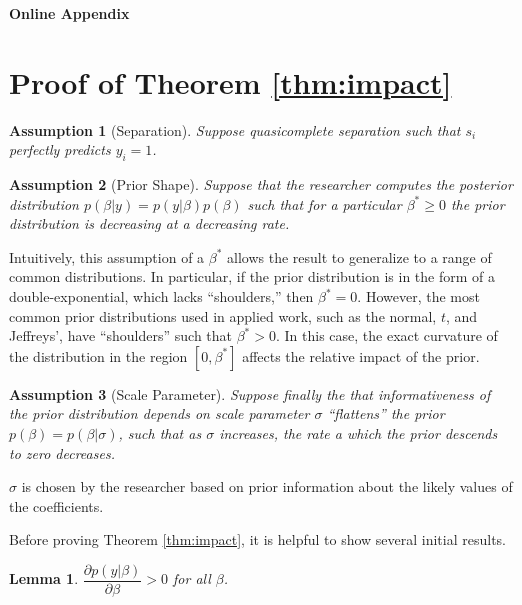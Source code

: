 \documentclass[12pt]{article}
\newtheorem{lemma}{Lemma}
\newtheorem{assumption}{Assumption}
\begin{document}
\clearpage
\begin{appendix}
\begin{center}
\LARGE{\textbf{Online Appendix}}\vspace{4mm}
\end{center}

\section*{Proof of Theorem \ref{thm:impact}}

\begin{assumption}[Separation]
Suppose quasicomplete separation such that $s_i$ perfectly predicts $y_i = 1$. 
\end{assumption}

\begin{assumption}[Prior Shape]
Suppose that the researcher computes the posterior distribution $p(\beta | y) = p(y | \beta)p(\beta)$ such that for a particular $\beta^* \geq 0$ the prior distribution is decreasing at a decreasing rate.
\end{assumption}

Intuitively, this assumption of a $\beta^*$ allows the result to generalize to a range of common distributions. In particular, if the prior distribution is in the form of a double-exponential, which lacks ``shoulders,'' then $\beta^* = 0$. However, the most common prior distributions used in applied work, such as the normal, $t$, and Jeffreys', have ``shoulders'' such that $\beta^* > 0$. In this case, the exact curvature of the distribution in the region $[0, \beta^*]$ affects the relative impact of the prior.

\begin{assumption}[Scale Parameter]
Suppose finally the that informativeness of the prior distribution depends on scale parameter $\sigma$ ``flattens'' the prior $p(\beta) = p(\beta | \sigma)$, such that as $\sigma$ increases, the rate a which the prior descends to zero decreases.
\end{assumption}

$\sigma$ is chosen by the researcher based on prior information about the likely values of the coefficients.

Before proving Theorem \ref{thm:impact}, it is helpful to show several initial results.

\begin{lemma}\label{thm:L1}
$\dfrac{\partial p(y | \beta)}{\partial \beta} > 0$ for all $\beta$. 
\end{lemma}


\end{appendix}
\end{document}
